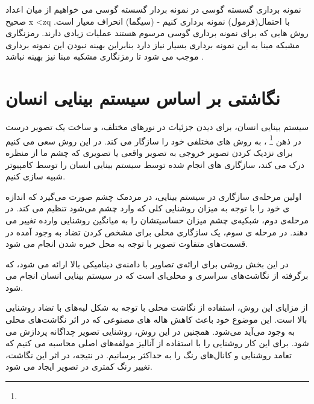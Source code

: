 
نمونه برداری گسسته گوسی 
در نمونه بردار گسسته گوسی می خواهیم از میان اعداد صحیح  x <zq با احتمال(فرمول) نمونه برداری کنیم - (سیگما) انحراف معیار است. روش هایی که برای نمونه برداری گوسی مرسوم هستند عملیات زیادی دارند.  رمزنگاری مشبکه مبنا به  این نمونه برداری بسیار نیاز دارد بنابراین بهینه نبودن این نمونه برداری موجب می شود تا رمزنگاری مشکبه مبنا نیز بهینه نباشد . 






\section{نگاشتی بر اساس سیستم بینایی انسان}
سیستم بینایی انسان، برای دیدن جزئیات در نورهای مختلف، و ساخت یک تصویر درست در ذهن
\footnote{}
، به روش های مختلفی خود را سازگار می کند.
 در این روش سعی می کنیم برای نزدیک کردن تصویر خروجی به تصویر واقعی یا تصویری که چشم ما از منظره درک می کند، سازگاری های انجام شده توسط سیستم بینایی انسان را توسط کامپیوتر شبیه سازی کنیم. 
 
 اولین مرحله‌ی سازگاری در سیستم بینایی، در مردمک چشم صورت می‌گیرد که اندازه ی خود را با توجه به میزان روشنایی کلی که وارد چشم می‌شود تنظیم می کند. در مرحله‌ی دوم، شبکیه‌ی چشم میزان حساسیتشان را به میانگین روشنایی وارده تغییر می دهند. در مرحله ی سوم، یک سازگاری محلی برای مشخص کردن تضاد به وجود آمده در قسمت‌های متفاوت تصویر با توجه به محل خیره شدن انجام می شود.
 
در این بخش روشی برای ارائه‌ی تصاویر با دامنه‌ی دینامیکی بالا ارائه می شود، که برگرفته از نگاشت‌های سراسری و محلی‌ای است که در سیستم بینایی انسان انجام می شود. 

از مزایای این روش، استفاده از نگاشت محلی با توجه به شکل لبه‌های با تضاد روشنایی بالا است. این موضوع خود باعث کاهش هاله های مصنوعی که در اثر نگاشت‌های محلی به وجود می‌آید می‌شود.
همچنین در این روش،  روشنایی تصویر  چداگانه پردازش می شود. برای این کار روشنایی را با استفاده از آنالیز مولفه‌های اصلی محاسبه می کنیم که تعامد روشنایی و کانال‌های رنگ را به حداکثر برسانیم. در نتیجه، در اثر این نگاشت، تغییر رنگ کمتری در تصویر ایجاد می شود.


